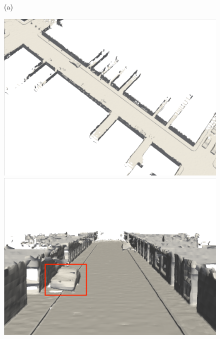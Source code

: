 \begin{figure}[htbp]
    \centering
    (a)
\begin{minipage}{0.322\linewidth}
    \centering
    \includegraphics[width=1\linewidth]{figures/mai_3_vox.png}
\end{minipage}\hfill
\begin{minipage}{0.322\linewidth}
    \centering
    \includegraphics[width=1\linewidth]{figures/mai_1_vox.png}
\end{minipage}\hfill
\begin{minipage}{0.322\linewidth}
    \centering

\end{minipage}
\end{figure}
